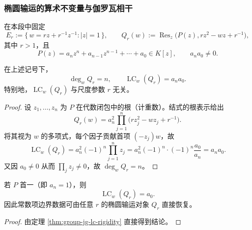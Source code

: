 

\subsubsection{椭圆输运的算术不变量与伽罗瓦相干}\label{subsubsec:group-jg-arithmetic-galois-coherence}

在本段中固定
\[
E_r:=\{\,w=r z+r^{-1}z^{-1}:|z|=1\,\},\qquad
Q_r(w):=\operatorname{Res}_{z}\!\bigl(P(z),r z^2-w z+r^{-1}\bigr),
\]
其中 \(r>1\)，且
\[
P(z)=a_n z^n+a_{n-1}z^{n-1}+\cdots+a_0\in K[z],\qquad a_n a_0\neq 0.
\]



\begin{theorem}[输运结式首项系数刚性]\label{thm:group-jg-lc-rigidity}
在上述记号下，
\[
\deg_w Q_r=n,\qquad \operatorname{LC}_w(Q_r)=a_n a_0.
\]
特别地，\(\operatorname{LC}_w(Q_r)\) 与尺度参数 \(r\) 无关。
\end{theorem}
\begin{proof}
设 \(z_1,\dots,z_n\) 为 \(P\) 在代数闭包中的根（计重数）。结式的根表示给出
\[
Q_r(w)=a_n^2\prod_{j=1}^{n}\bigl(r z_j^2-w z_j+r^{-1}\bigr).
\]
将其视为 \(w\) 的多项式，每个因子贡献首项 \((-z_j)w\)，故
\[
\operatorname{LC}_w(Q_r)
=a_n^2(-1)^n\prod_{j=1}^{n}z_j
=a_n^2(-1)^n\cdot(-1)^n\frac{a_0}{a_n}
=a_n a_0.
\]
又因 \(a_0\neq 0\) 从而 \(\prod_j z_j\neq 0\)，故 \(\deg_w Q_r=n\)。
\end{proof}

\begin{corollary}[首一情形的边界系数读出]\label{cor:group-jg-monic-boundary-readout}
若 \(P\) 首一（即 \(a_n=1\)），则
\[
\operatorname{LC}_w(Q_r)=a_0.
\]
因此常数项边界数据可由任意 \(r\) 的椭圆输运对象 \(Q_r\) 直接恢复。
\end{corollary}
\begin{proof}
由定理 \ref{thm:group-jg-lc-rigidity} 直接得到结论。
\end{proof}

